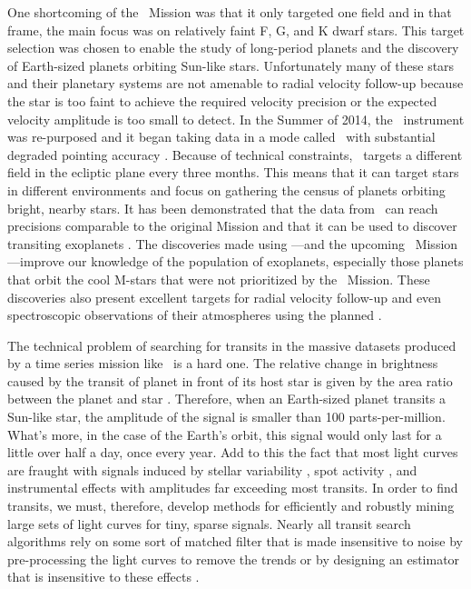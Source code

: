 
One shortcoming of the \kepler\ Mission was that it only targeted one field
and in that frame, the main focus was on relatively faint F, G, and K dwarf
stars.
This target selection was chosen to enable the study of long-period planets
and the discovery of Earth-sized planets orbiting Sun-like stars.
Unfortunately many of these stars and their planetary systems are not amenable
to radial velocity follow-up because the star is too faint to achieve the
required velocity precision or the expected velocity amplitude is too small to
detect.
In the Summer of 2014, the \kepler\ instrument was re-purposed and it began
taking data in a mode called \KT\ with substantial degraded pointing accuracy
\citep{Howell:2014}.
Because of technical constraints, \KT\ targets a different field in the
ecliptic plane every three months.
This means that it can target stars in different environments and focus on
gathering the census of planets orbiting bright, nearby stars.
It has been demonstrated that the data from \KT\ can reach precisions
comparable to the original Mission and that it can be used to discover
transiting exoplanets \citep[][and ]{Vanderburg:2014,
Vanderburg:2015, Crossfield:2015, Foreman-Mackey:2015}.
The discoveries made using \KT---and the upcoming \tess\ Mission---improve our
knowledge of the population of exoplanets, especially those planets that orbit
the cool M-stars that were not prioritized by the \kepler\ Mission.
These discoveries also present excellent targets for radial velocity follow-up
and even spectroscopic observations of their atmospheres using the planned
.

The technical problem of searching for transits in the massive datasets
produced by a time series mission like \kepler\ is a hard one.
The relative change in brightness caused by the transit of planet in front of
its host star is given by the area ratio between the planet and star
\citep{Winn:2010}.
Therefore, when an Earth-sized planet transits a Sun-like star, the amplitude
of the signal is smaller than 100 parts-per-million.
What's more, in the case of the Earth's orbit, this signal would only last for
a little over half a day, once every year.
Add to this the fact that most light curves are fraught with signals induced
by stellar variability \citep{Basri:2013}, spot activity
\citep{McQuillan:2014}, and instrumental effects \citep{Stumpe:2012,
Smith:2012} with amplitudes far exceeding most transits.
In order to find transits, we must, therefore, develop methods for efficiently
and robustly mining large sets of light curves for tiny, sparse signals.
Nearly all transit search algorithms rely on some sort of matched filter that
is made insensitive to noise by pre-processing the light curves to remove the
trends or by designing an estimator that is insensitive to these effects
\citep[][]{Kovacs:2002, Kovacs:2005, Berta:2012, Petigura:2013,
Foreman-Mackey:2015}.

